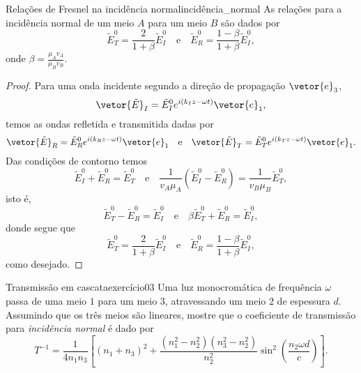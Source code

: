 \begin{lemma}{Relações de Fresnel na incidência normal}{incidência_normal}
    As relações para a incidência normal de um meio \(A\) para um meio \(B\) são dados por
    \begin{equation*}
        \tilde{E}^0_T = \frac{2}{1 + \beta} \tilde{E}^0_I \quad\text{e}\quad
        \tilde{E}^0_R = \frac{1 - \beta}{1 + \beta}\tilde{E}^0_I,
    \end{equation*}
    onde \(\beta = \frac{\mu_A v_A}{\mu_B v_B}\).
\end{lemma}
\begin{proof}
    Para uma onda incidente segundo a direção de propagação \(\vetor{e}_3\),
    \begin{equation*}
        \vetor{\tilde{E}}_I = \tilde{E}^0_I e^{i(k_Iz - \omega t)} \vetor{e}_1,
    \end{equation*}
    temos as ondas refletida e transmitida dadas por
    \begin{equation*}
        \vetor{\tilde{E}}_R = \tilde{E}^0_R e^{i(k_Rz - \omega t)} \vetor{e}_1\quad\text{e}\quad
        \vetor{\tilde{E}}_T = \tilde{E}^0_T e^{i(k_Tz - \omega t)} \vetor{e}_1.
    \end{equation*}
    Das condições de contorno temos
    \begin{equation*}
        \tilde{E}^0_I + \tilde{E}^0_R = \tilde{E}^0_T\quad\text{e}\quad\frac{1}{v_A\mu_A} (\tilde{E}^0_I - \tilde{E}^0_R) = \frac{1}{v_B\mu_B} \tilde{E}^0_T,
    \end{equation*}
    isto é,
    \begin{equation*}
        \tilde{E}^0_T - \tilde{E}^0_R = \tilde{E}^0_I\quad\text{e}\quad \beta \tilde{E}^0_T + \tilde{E}^0_R = \tilde{E}^0_I,
    \end{equation*}
    donde segue que
    \begin{equation*}
        \tilde{E}^0_T = \frac{2}{1 + \beta} \tilde{E}^0_I\quad\text{e}\quad \tilde{E}^0_R = \frac{1 - \beta}{1 + \beta} \tilde{E}^0_I,
    \end{equation*}
    como desejado.
\end{proof}
\begin{exercício}{Transmissão em cascata}{exercício03}
    Uma luz monocromática de frequência \(\omega\) passa de uma meio \(1\) para um meio \(3\), atravessando um meio \(2\) de espessura \(d\). Assumindo que os três meios são lineares, mostre que o coeficiente de transmissão para \emph{incidência normal} é dado por
    \begin{equation*}
        T^{-1} = \frac{1}{4n_1n_3} \left[(n_1 + n_3)^2 + \frac{(n_1^2 - n_2^2)(n_3^2 - n_2^2)}{n_2^2}\sin^2\left(\frac{n_2\omega d}{c}\right)\right].
    \end{equation*}
\end{exercício}
